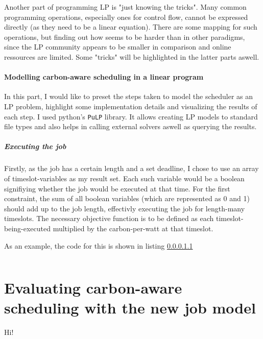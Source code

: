 Another part of programming LP is "just knowing the tricks". 
Many common programming operations, especially ones for control flow, cannot be expressed directly (as they need to be a linear equation).
There are some mapping for such operations, but finding out how seems to be harder than in other paradigms, since the LP community appears to be smaller in comparison and online ressources are limited.
Some "tricks" will be highlighted in the latter parts aswell. 

\paragraph{Modelling carbon-aware scheduling in a linear program}

In this part, I would like to preset the steps taken to model the scheduler as an LP problem, highlight some implementation details and visualizing the results of each step.
I used python's \verb|PuLP| library.
It allows creating LP models to standard file types and also helps in calling external solvers aswell as querying the results.

\subparagraph{Executing the job}

Firstly, as the job has a certain length and a set deadline, I chose to use an array of timeslot-variables as my result set. Each such variable would be a boolean signifiying whether the job would be executed at that time.
For the first constraint, the sum of all boolean variables (which are represented as 0 and 1) should add up to the job length, effectivly executing the job for length-many timeslots.
The necessary objective function is to be defined as each timeslot-being-executed multiplied by the carbon-per-watt at that timeslot.

As an example, the code for this is shown in listing \ref{}

\begin{lstlisting}

\end{lstlisting}




\section{Evaluating carbon-aware scheduling with the new job model} \label{sec:evaluate_scheduling}

Hi!
